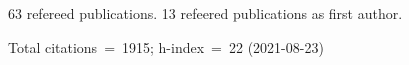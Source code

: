 63 refereed publications. 13 refeered publications as first author.

Total citations~=~1915; h-index~=~22 (2021-08-23)